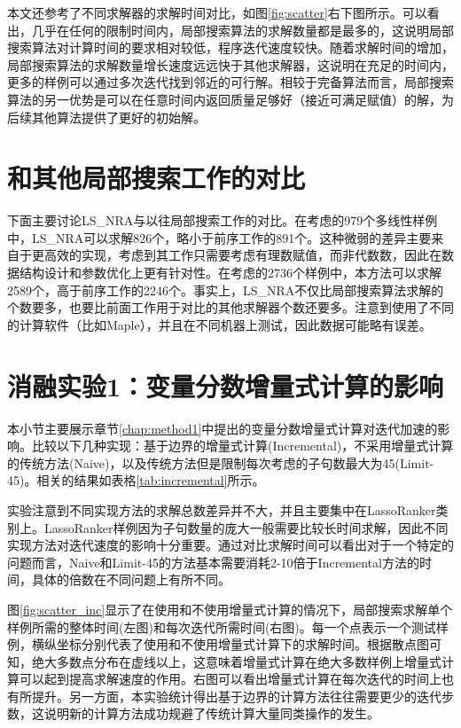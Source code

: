 本文还参考了不同求解器的求解时间对比，如图\ref{fig:scatter}右下图所示。可以看出，几乎在任何的限制时间内，局部搜索算法的求解数量都是最多的，这说明局部搜索算法对计算时间的要求相对较低，程序迭代速度较快。随着求解时间的增加，局部搜索算法的求解数量增长速度远远快于其他求解器，这说明在充足的时间内，更多的样例可以通过多次迭代找到邻近的可行解。相较于完备算法而言，局部搜索算法的另一优势是可以在任意时间内返回质量足够好（接近可满足赋值）的解，为后续其他算法提供了更好的初始解。



\section{和其他局部搜索工作的对比}
下面主要讨论LS\_NRA与以往局部搜索工作的对比。在\cite{multilinear}考虑的979个多线性样例中，LS\_NRA可以求解826个，略小于前序工作的891个。这种微弱的差异主要来自于\cite{multilinear}更高效的实现，考虑到其工作只需要考虑有理数赋值，而非代数数，因此在数据结构设计和参数优化上更有针对性。在\cite{LiXZ23}考虑的2736个样例中，本方法可以求解2589个，高于前序工作的2246个。事实上，LS\_NRA不仅比局部搜索算法求解的个数要多，也要比前面工作用于对比的其他求解器个数还要多。注意到\cite{LiXZ23}使用了不同的计算软件（比如Maple），并且在不同机器上测试，因此数据可能略有误差。

\section{消融实验1：变量分数增量式计算的影响}
本小节主要展示章节\ref{chap:method1}中提出的变量分数增量式计算对迭代加速的影响。比较以下几种实现：基于边界的增量式计算(Incremental)，不采用增量式计算的传统方法(Naive)，以及传统方法但是限制每次考虑的子句数最大为45(Limit-45)。相关的结果如表格\ref{tab:incremental}所示。

实验注意到不同实现方法的求解总数差异并不大，并且主要集中在LassoRanker类别上。LassoRanker样例因为子句数量的庞大一般需要比较长时间求解，因此不同实现方法对迭代速度的影响十分重要。通过对比求解时间可以看出对于一个特定的问题而言，Naive和Limit-45的方法基本需要消耗2-10倍于Incremental方法的时间，具体的倍数在不同问题上有所不同。

图\ref{fig:scatter_inc}显示了在使用和不使用增量式计算的情况下，局部搜索求解单个样例所需的整体时间(左图)和每次迭代所需时间(右图)。每一个点表示一个测试样例，横纵坐标分别代表了使用和不使用增量式计算下的求解时间。根据散点图可知，绝大多数点分布在虚线以上，这意味着增量式计算在绝大多数样例上增量式计算可以起到提高求解速度的作用。右图可以看出增量式计算在每次迭代的时间上也有所提升。另一方面，本实验统计得出基于边界的计算方法往往需要更少的迭代步数，这说明新的计算方法成功规避了传统计算大量同类操作的发生。


